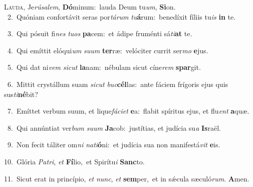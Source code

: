 \lettrine{\initial\textcolor{\initialcolor}{L}}{auda,} Je\-\textit{rú}\-\textit{sa}\textit{lem}, \textbf{Dó}\-minum:~\star lauda Deum tu\-\textit{um}\-, \textbf{Si}\-on.\\
{\numbfont\textcolor{\numbcolor}{~2.}}~Quóniam confortávit seras por\-\textit{tá}\-\textit{rum} \textit{tu}\-\textbf{á}rum:~\star benedíxit fíliis tu\textit{is} \textbf{in} te.\par
{\numbfont\textcolor{\numbcolor}{~3.}}~Qui pósuit fi\textit{nes} \textit{tu}\-\textit{os} \textbf{pa}\-cem:~\star et ádipe fruménti sá\-\textit{ti}\-\textbf{at} te.\par
{\numbfont\textcolor{\numbcolor}{~4.}}~Qui emíttit elóqui\textit{um} \textit{su}\-\textit{um} \textbf{ter}\-ræ:~\star velóciter currit ser\textit{mo} \textbf{e}\-jus.\par
{\numbfont\textcolor{\numbcolor}{~5.}}~Qui dat ni\textit{vem} \textit{sic}\-\textit{ut} \textbf{la}\-nam:~\star nébulam sicut cíne\textit{rem} \textbf{spar}\-git.\par
{\numbfont\textcolor{\numbcolor}{~6.}}~Mittit crystállum suam \textit{sic}\-\textit{ut} \textit{buc}\-\textbf{cél}las:~\star ante fáciem frígoris ejus quis sus\-\textit{ti}\-\textbf{né}bit?\par
{\numbfont\textcolor{\numbcolor}{~7.}}~Emíttet verbum suum, et lique\-\textit{fá}\-\textit{ci}\textit{et} \textbf{e}\-a:~\star flabit spíritus ejus, et flu\textit{ent} \textbf{a}\-quæ.\par
{\numbfont\textcolor{\numbcolor}{~8.}}~Qui annúntiat ver\textit{bum} \textit{su}\-\textit{um} \textbf{Ja}\-cob:~\star justítias, et judícia su\textit{a} \textbf{Is}\-raël.\par
{\numbfont\textcolor{\numbcolor}{~9.}}~Non fecit táliter om\textit{ni} \textit{na}\-\textit{ti}\textbf{ó}ni:~\star et judícia sua non manifestá\textit{vit} \textbf{e}\-is.\par
{\numbfont\textcolor{\numbcolor}{10.}}~Glória \textit{Pa}\-\textit{tri}, \textit{et} \textbf{Fí}\-lio,~\star et Spirítu\textit{i} \textbf{Sanc}\-to.\par
{\numbfont\textcolor{\numbcolor}{11.}}~Sicut erat in princípio, \textit{et} \textit{nunc}\-, \textit{et} \textbf{sem}\-per,~\star et in sǽcula sæculó\-\textit{rum}\-. \textbf{A}\-men.\par
